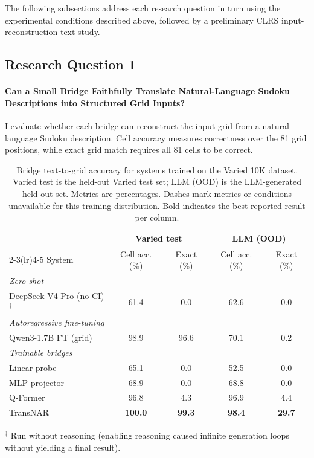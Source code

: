 \documentclass[11pt]{article}
\begin{document}
The following subsections address each research question in turn using the experimental conditions described above, followed by a preliminary CLRS input-reconstruction text study.

\subsection*{Research Question 1}
\label{sec:bridge_performance}

\paragraph{Can a Small Bridge Faithfully Translate Natural-Language Sudoku Descriptions into Structured Grid Inputs?}
I evaluate whether each bridge can reconstruct the input grid from a natural-language Sudoku description.
Cell accuracy measures correctness over the 81 grid positions, while exact grid match requires all 81 cells to be correct.

\begin{table}[t]
\centering
\caption{Bridge text-to-grid accuracy for systems trained on the Varied 10K dataset. Varied test is the held-out Varied test set; LLM (OOD) is the LLM-generated held-out set. Metrics are percentages. Dashes mark metrics or conditions unavailable for this training distribution. Bold indicates the best reported result per column.}
\label{tab:bridge_varied}
\begin{tabular}{lcccc}
\toprule
& \multicolumn{2}{c}{Varied test} & \multicolumn{2}{c}{LLM (OOD)} \\
\cmidrule(lr){2-3}\cmidrule(lr){4-5}
System & Cell acc. (\%) & Exact (\%) & Cell acc. (\%) & Exact (\%) \\
\midrule
\multicolumn{5}{l}{\textit{Zero-shot}} \\
\midrule
DeepSeek-V4-Pro (no CI)$^\dagger$ & 61.4 & 0.0 & 62.6 & 0.0 \\
\midrule
\multicolumn{5}{l}{\textit{Autoregressive fine-tuning}} \\
\midrule
Qwen3-1.7B FT (grid)          & 98.9 & 96.6 & 70.1 & 0.2 \\
\midrule
\multicolumn{5}{l}{\textit{Trainable bridges}} \\
\midrule
Linear probe  & 65.1 & 0.0 & 52.5 & 0.0 \\
MLP projector & 68.9 & 0.0 & 68.8 & 0.0 \\
Q-Former      & 96.8 & 4.3 & 96.9 & 4.4 \\
TransNAR      & \textbf{100.0} & \textbf{99.3} & \textbf{98.4} & \textbf{29.7} \\
\bottomrule
\end{tabular}

\vspace{0.5em}
\noindent\small $^\dagger$ Run without reasoning (enabling reasoning caused infinite generation loops without yielding a final result).
\end{table}
\end{document}
